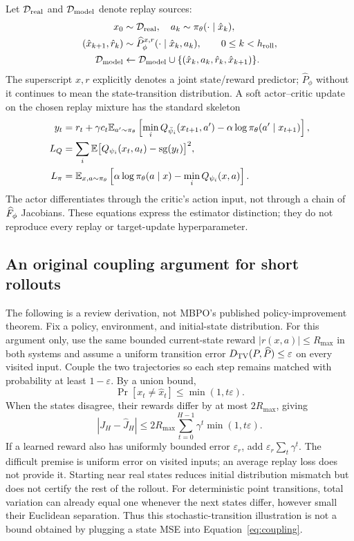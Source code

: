 Let $\mathcal D_{\rm real}$ and $\mathcal D_{\rm model}$ denote replay sources:
\begin{align}
x_0&\sim\mathcal D_{\rm real},\quad a_k\sim\pi_\theta(\cdot\mid\hat x_k),\\
(\hat x_{k+1},\hat r_k)&\sim\widehat P_\phi^{x,r}(\cdot\mid\hat x_k,a_k),
\qquad 0\le k<h_{\rm roll},\\
\mathcal D_{\rm model}&\leftarrow\mathcal D_{\rm model}\cup
\{(\hat x_k,a_k,\hat r_k,\hat x_{k+1})\}.
\end{align}
The superscript $x,r$ explicitly denotes a joint state/reward predictor;
$\widehat P_\phi$ without it continues to mean the state-transition distribution.
A soft actor--critic update on the chosen replay mixture has the standard skeleton
\begin{align}
y_t&=r_t+\gamma c_t\mathbb E_{a'\sim\pi_\theta}
\left[\min_iQ_{\bar\psi_i}(x_{t+1},a')-\alpha\log\pi_\theta(a'\mid x_{t+1})\right],\\
L_Q&=\sum_i\mathbb E\big[Q_{\psi_i}(x_t,a_t)-\operatorname{sg}(y_t)\big]^2,\\
L_\pi&=\mathbb E_{x,a\sim\pi_\theta}\left[\alpha\log\pi_\theta(a\mid x)-\min_iQ_{\psi_i}(x,a)\right].
\end{align}
The actor differentiates through the critic's action input, not through a chain
of $\widehat F_\phi$ Jacobians. These equations express the estimator distinction; they
do not reproduce every replay or target-update hyperparameter.

\subsection{An original coupling argument for short rollouts}
The following is a review derivation, not MBPO's published policy-improvement
theorem. Fix a policy, environment, and initial-state distribution. For this argument only, use the same
bounded current-state reward $|r(x,a)|\le R_{\max}$ in both systems and assume a
uniform transition error $D_{\mathrm{TV}}(P,\widehat P)\le\varepsilon$ on every visited input.
Couple the two trajectories so each step remains matched with probability at
least $1-\varepsilon$. By a union bound,
\begin{equation}
\Pr[x_t\ne\hat x_t]\le\min(1,t\varepsilon).
\end{equation}
When the states disagree, their rewards differ by at most $2R_{\max}$, giving
\begin{equation}\label{eq:coupling}
|J_H-\widehat J_H|\le2R_{\max}\sum_{t=0}^{H-1}\gamma^t\min(1,t\varepsilon).
\end{equation}
If a learned reward also has uniformly bounded error $\varepsilon_r$, add
$\varepsilon_r\sum_t\gamma^t$. The difficult premise is uniform error on visited
inputs; an average replay loss does not provide it. Starting near real states
reduces initial distribution mismatch but does not certify the rest of the rollout.
For deterministic point transitions, total variation can already equal one
whenever the next states differ, however small their Euclidean separation.
Thus this stochastic-transition illustration is not a bound obtained by plugging
a state MSE into Equation~\eqref{eq:coupling}.

